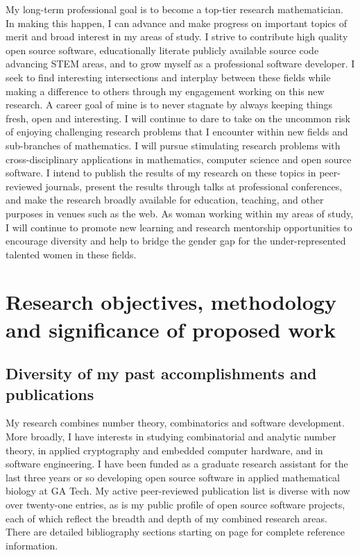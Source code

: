 \documentclass[10pt,reqno,letterpaper]{article}
\theoremstyle{plain}
\numberwithin{theorem}{section}
\theoremstyle{definition}
\begin{document}
My long-term professional goal is to become a top-tier research mathematician. In making this happen, 
I can advance and make progress on important topics of merit and broad interest in my areas of study. 
I strive to contribute high quality open source software, educationally 
literate publicly available source code advancing STEM areas, and to grow myself as a 
professional software developer. 
I seek to find interesting intersections and interplay between these fields while making 
a difference to others through my engagement working on this new research. 
A career goal of mine is to never stagnate by always keeping things 
fresh, open and interesting. I will continue to dare to take on the uncommon risk of enjoying 
challenging research problems that I encounter within new fields and 
sub-branches of mathematics. 
I will pursue stimulating research problems 
with cross-disciplinary applications in mathematics, computer science and open source software. I intend to 
publish the results of my research on these topics in peer-reviewed journals, present 
the results through talks at professional conferences, and make the research broadly 
available for education, teaching, and other purposes in venues such as the web. As 
woman working within my areas of study, I will continue to promote new learning 
and research mentorship opportunities to encourage diversity and help to bridge the gender 
gap for the under-represented talented women in these fields.

\section{Research objectives, methodology and significance of proposed work} 
\label{Section_SummaryOfPriorWork} 

\subsection{Diversity of my past accomplishments and publications}

My research combines number theory, combinatorics and software development. 
More broadly, I have interests in studying combinatorial and analytic number theory, 
in applied cryptography and embedded computer hardware, and in software engineering. 
I have been funded as a graduate research assistant for the last three years or so developing 
open source software in applied mathematical biology at GA Tech. 
My active peer-reviewed publication list is diverse with now over twenty-one entries, as is my 
public profile of open source software projects, each of which reflect the breadth and 
depth of my combined research areas. 
There are detailed bibliography sections starting on page 
\pageref{page_Section_BibliographyB} for complete reference information. 
\end{document}
